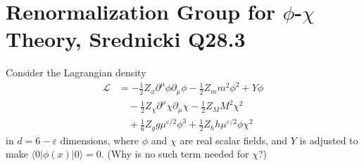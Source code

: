 \section{Renormalization Group for $\phi$-$\chi$ Theory, Srednicki Q28.3}

Consider the Lagrangian density
\begin{equation}
    \begin{aligned}
        \mathcal{L} &= -\tfrac{1}{2}Z_\phi\partial^\mu\phi\partial_\mu\phi - \tfrac{1}{2}Z_m m^2\phi^2 + Y\phi\\
        &\quad -\tfrac{1}{2}Z_\chi\partial^\mu\chi\partial_\mu\chi - \tfrac{1}{2}Z_M M^2\chi^2\\
        &\quad +\tfrac{1}{6}Z_g g\mu^{\varepsilon/2}\phi^3 + \tfrac{1}{2}Z_h h\mu^{\varepsilon/2}\phi\chi^2
    \end{aligned}
\end{equation}
in $d=6-\varepsilon$ dimensions, where $\phi$ and $\chi$ are real scalar fields, and $Y$ is adjusted to make $\langle 0|\phi(x)|0\rangle = 0$. (Why is no such term needed for $\chi$?)

